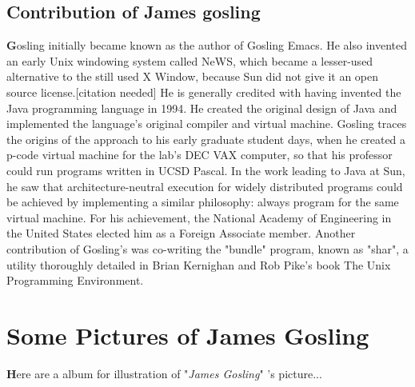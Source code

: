 \documentclass[paper = A5, headinclude, parskip = full, oneside, font = 11 pt]{report}
\begin{document}
\subsection{Contribution of James gosling}
\color{black}
\textbf{G}osling initially became known as the author of Gosling Emacs. He also invented an early Unix windowing system called NeWS, which became a lesser-used alternative to the still used X Window, because Sun did not give it an open source license.[citation needed] He is generally credited with having invented the Java programming language in 1994. He created the original design of Java and implemented the language's original compiler and virtual machine. Gosling traces the origins of the approach to his early graduate student days, when he created a p-code virtual machine for the lab's DEC VAX computer, so that his professor could run programs written in UCSD Pascal. In the work leading to Java at Sun, he saw that architecture-neutral execution for widely distributed programs could be achieved by implementing a similar philosophy: always program for the same virtual machine.
For his achievement, the National Academy of Engineering in the United States elected him as a Foreign Associate member. Another contribution of Gosling's was co-writing the "bundle" program, known as "shar", a utility thoroughly detailed in Brian Kernighan and Rob Pike's book The Unix Programming Environment.

\color{red}
\section{Some Pictures of James Gosling}
\color{black}
\textbf{H}ere are a album for illustration of "\textit{James Gosling}" 's picture...

\newpage
\end{document}
